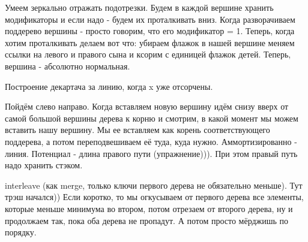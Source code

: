 \documentclass{article}
\begin{document}
Умеем зеркально отражать подотрезки. Будем в каждой вершине хранить модификаторы и если надо - будем их проталкивать вниз. Когда разворачиваем поддерево вершины - просто говорим, что его модификатор = 1. Теперь, когда хотим проталкивать делаем вот что: убираем флажок в нашей вершине меняем ссылки на левого и правого сына и ксорим с единицей флажок детей. Теперь, вершина - абсолютно нормальная. 

Построение декартача за линию, когда x уже отсорчены.

Пойдём слево направо. Когда вставляем новую вершину идём снизу вверх от самой большой вершины дерева к корню и смотрим, в какой момент мы можем вставить нашу вершину. Мы ее вставляем как корень соответствующего поддерева, а потом переподвешиваем её туда, куда нужно. Аммортизированно - линия. Потенциал - длина правого пути (упражнение))). При этом правый путь надо хранить стэком.

interleave (как merge, только ключи первого дерева не обязательно меньше).
Тут трэш начался)) Если коротко, то мы огкусываем от первого дерева все элементы, которые меньше минимума во втором, потом отрезаем от второго дерева, ну и продолжаем так, пока оба дерева не пропадут. А потом просто мёрджишь по порядку.
\end{document}
